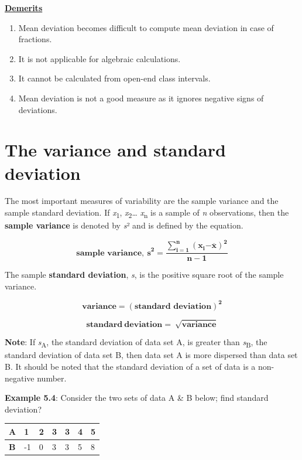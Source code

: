 \documentclass[
]{book}
\begin{document}
\ul{\textbf{Demerits}}

\begin{enumerate}
\def\labelenumi{\arabic{enumi}.}
\item
  Mean deviation becomes difficult to compute mean deviation in case
  of fractions.
\item
  It is not applicable for algebraic calculations.
\item
  It cannot be calculated from open-end class intervals.
\item
  Mean deviation is not a good measure as it ignores negative signs of
  deviations.
\end{enumerate}

\section{The variance and standard deviation}\label{the-variance-and-standard-deviation}

The most important measures of variability are the sample variance and
the sample standard deviation. If \emph{x}\textsubscript{1}, \emph{x}\textsubscript{2}\ldots{} \emph{x}\textsubscript{n} is a sample
of \emph{n} observations, then the \textbf{sample variance} is denoted by \emph{s}² and
is defined by the equation.

\[{\mathbf{\text{sample variance}},\ \mathbf{s}}^{\mathbf{2}}\mathbf{=}\frac{\sum_{\mathbf{i = 1}}^{\mathbf{n}}\left( \mathbf{x}_{\mathbf{i}}\mathbf{-}\overline{\mathbf{x}} \right)^{\mathbf{2}}}{\mathbf{n - 1}}\]

The sample \textbf{standard deviation}, \emph{s}, is the positive square root of
the sample variance.

\[\mathbf{variance =}\left( \mathbf{\text{standard deviation}} \right)^{\mathbf{2}}\]

\[\mathbf{standard\ deviation = \ }\sqrt{\mathbf{\text{variance}}}\]

\textbf{Note}: If \emph{s}\textsubscript{A}, the standard deviation of data set A, is greater
than \emph{s}\textsubscript{B}, the standard deviation of data set B, then data set A is
more dispersed than data set B. It should be noted that the standard
deviation of a set of data is a non-negative number.

\textbf{Example 5.4}: Consider the two sets of data A \& B below; find
standard deviation?

\begin{longtable}[]{@{}lllllll@{}}
\toprule\noalign{}
\textbf{A} & 1 & 2 & 3 & 3 & 4 & 5 \\
\midrule\noalign{}
\endhead
\bottomrule\noalign{}
\endlastfoot
\textbf{B} & -1 & 0 & 3 & 3 & 5 & 8 \\
\end{longtable}
\end{document}
